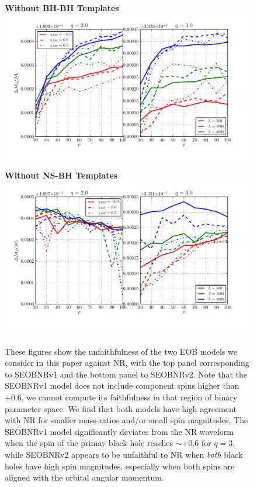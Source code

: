 \documentclass[aps,prd,amsmath,floats,floatfix, twocolumn,
superscriptaddress,nofootinbib,showpacs]{revtex4-1}
\begin{document}
\begin{figure}[h]
\centering 
\textbf{Without BH-BH Templates}
\includegraphics[width=2\columnwidth]{plots/TN_chirpMassBias_vs_SNR_q23.pdf}\\ 
\textbf{Without NS-BH Templates}
\includegraphics[width=2\columnwidth]{plots/TT_chirpMassBias_vs_SNR_q23.pdf}%
\caption{These figures show the unfaithfulness of the two EOB models we consider
in this paper against NR, with the top panel corresponding to SEOBNRv1 and the bottom panel to
SEOBNRv2. Note that the SEOBNRv1 model does not include component spins
higher than $+0.6$, we cannot compute its faithfulness in that region of binary parameter space.
We find that both models have high agreement with NR for smaller mass-ratios 
and/or small spin magnitudes. The SEOBNRv1 model significantly deviates from the NR 
waveform when the spin of the primay black hole reaches $\sim +0.6$ for $q=3$, while
SEOBNRv2 appears to be unfaithful to NR when \textit{both} black holes have high spin 
magnitudes, especially when both spins are aligned with the orbital angular momentum.
}
\label{fig:SEOB_unfaith_TotalMass_Spin1z_Spin2z}
\end{figure}
\end{document}
